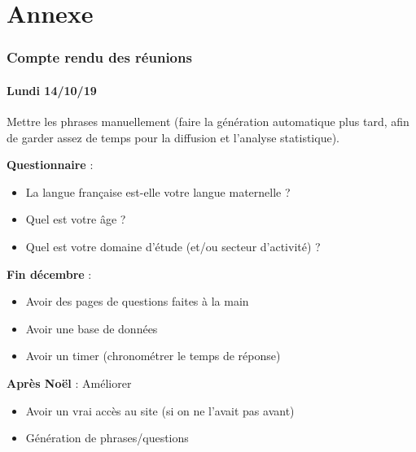 \documentclass[11pt,letterpaper]{article}
\begin{document}
\newpage

\part{Annexe}
\setcounter{section}{0}

\section{Compte rendu des réunions}

\subsection{Lundi 14/10/19}
Mettre les phrases manuellement (faire la génération automatique plus
tard, afin de garder assez de temps pour la diffusion et l'analyse statistique). \vspace{5mm}
    
\textbf{Questionnaire} :
\begin{itemize}
    \item La langue française est-elle votre langue maternelle ?
    \item Quel est votre âge ?
    \item Quel est votre domaine d'étude (et/ou secteur d'activité) ?
\end{itemize} \vspace{5mm}

\textbf{Fin décembre} :
\begin{itemize}
    \item Avoir des pages de questions faites à la main
    \item Avoir une base de données
    \item Avoir un timer (chronométrer le temps de réponse)
\end{itemize} \vspace{5mm}
    
\textbf{Après Noël} : Améliorer
\begin{itemize}
    \item Avoir un vrai accès au site (si on ne l'avait pas avant)
    \item Génération de phrases/questions
\end{itemize} \vspace{5mm}
    
\end{document}
